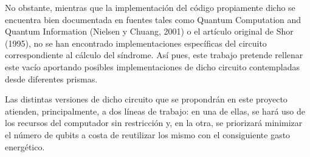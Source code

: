 No obstante, mientras que la implementación del código propiamente dicho se encuentra bien documentada en fuentes tales como Quantum Computation and Quantum Information (Nielsen y Chuang, 2001) o el artículo original de Shor (1995), no se han encontrado implementaciones específicas del circuito correspondiente al cálculo del síndrome. Así pues, este trabajo pretende rellenar este vacío aportando posibles implementaciones de dicho circuito contempladas desde diferentes prismas. 

Las distintas versiones de dicho circuito que se propondrán en este proyecto atienden, principalmente, a dos líneas de trabajo: en una de ellas, se hará uso de los recursos del computador sin restricción y, en la otra, se priorizará minimizar el número de qubits a costa de reutilizar los mismo con el consiguiente gasto energético. 
